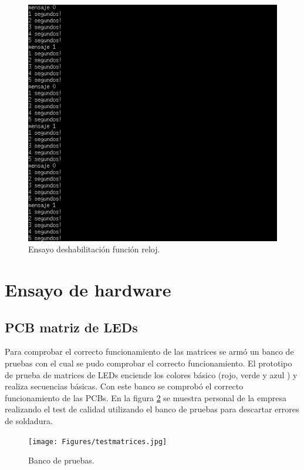 \begin{figure}[htpb]
	\centering
	\includegraphics[scale=0.8]{Figures/pruebareloj4.png} 
	\caption{Ensayo deshabilitación función reloj.}
	\label{fig: ensayo reloj 4}
\end{figure}




\section{Ensayo de hardware}
\subsection{PCB matriz de LEDs}
Para comprobar el correcto funcionamiento de las matrices se armó un banco de pruebas con el cual se pudo comprobar el correcto funcionamiento. El prototipo de prueba de matrices de LEDs enciende los colores básico (rojo, verde y azul ) y realiza secuencias básicas. Con este banco se comprobó el correcto funcionamiento de las PCBs. En la figura \ref{fig: banco de pruebas} se muestra personal de la empresa realizando el  test de calidad utilizando el banco de pruebas para descartar errores de soldadura.

\begin{figure}[htpb]
	\centering
	\texttt{[image: Figures/testmatrices.jpg]} 
	\caption{Banco de pruebas.}
	\label{fig: banco de pruebas}
\end{figure}



